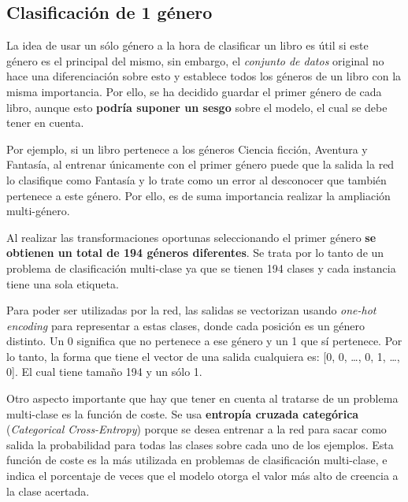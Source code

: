 \documentclass[12pt,a4paper, xcolor=table]{article}
\begin{document}
\newpage


\subsection{Clasificación de 1 género}

La idea de usar un sólo género a la hora de clasificar un libro es útil si este género es el principal del mismo, sin embargo, el \textit{conjunto de datos} original no hace una diferenciación sobre esto y establece todos los géneros de un libro con la misma importancia. Por ello, se ha decidido guardar el primer género de cada libro, aunque esto \textbf{podría suponer un sesgo }sobre el modelo, el cual se debe tener en cuenta.

\vspace{2mm}

Por ejemplo, si un libro pertenece a los géneros Ciencia ficción, Aventura y Fantasía, al entrenar únicamente con el primer género puede que la salida la red lo clasifique como Fantasía y lo trate como un error al desconocer que también pertenece a este género. Por ello, es de suma importancia realizar la ampliación multi-género.

\vspace{3mm}

Al realizar las transformaciones oportunas seleccionando el primer género \textbf{se obtienen un total de 194 géneros diferentes}. Se trata por lo tanto de un problema de clasificación multi-clase ya que se tienen 194 clases y cada instancia tiene una sola etiqueta.

\vspace{3mm}

Para poder ser utilizadas por la red, las salidas se vectorizan usando \textit{one-hot encoding} para representar a estas clases, donde cada posición es un género distinto. Un 0 significa que no pertenece a ese género y un 1 que sí pertenece. Por lo tanto, la forma que tiene el vector de una salida cualquiera es: [0, 0, …, 0, 1, …, 0]. El cual tiene tamaño 194 y un sólo 1.

\vspace{3mm}

Otro aspecto importante que hay que tener en cuenta al tratarse de un problema multi-clase es la función de coste. Se usa \textbf{entropía cruzada categórica} (\textit{Categorical Cross-Entropy}) porque se desea entrenar a la red para sacar como salida la probabilidad para todas las clases sobre cada uno de los ejemplos. Esta función de coste es la más utilizada en problemas de clasificación multi-clase, e indica el porcentaje de veces que el modelo otorga el valor más alto de creencia a la clase acertada.
\end{document}
